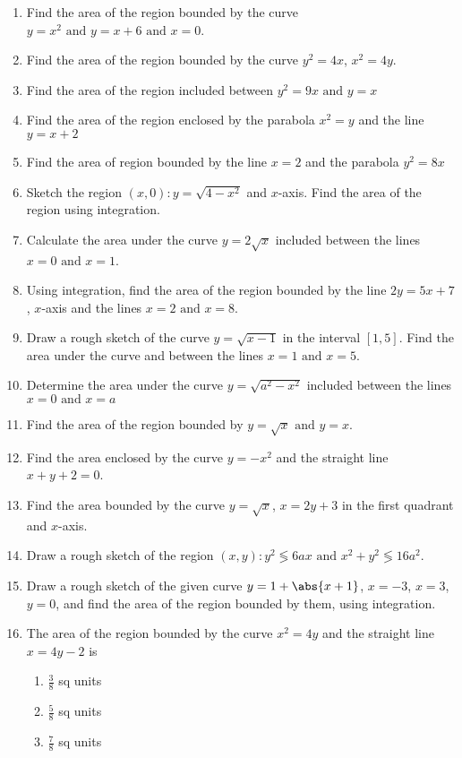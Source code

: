 \begin{enumerate}[label=\thesubsection.\arabic*,ref=\thesubsection.\theenumi]
\item Find the area of the region bounded by the curve $y = x^2\text{ and }y = x + 6\text{ and }x = 0$.
\item Find the area of the region bounded by the curve $y^2 = 4x$, $x^2 = 4y$.
\item Find the area of the region included between $y^2 = 9x\text{ and }y =x$
\item Find the area of the region enclosed by the parabola $x^2 = y$ and the line $y = x + 2$
\item Find the area of region bounded by the line $x = 2$ and the parabola $y^2 = 8x$
\item Sketch the region ${(x,0) : y = \sqrt{4 - x^2}}$ and $x$-axis. Find the area of the region using integration.
\item Calculate the area under the curve $y = 2\sqrt{x}$ included between the lines $x = 0\text{ and }x = 1$.
\item Using integration, find the area of the region bounded by the line $2y = 5x + 7$, $x$-axis and the lines $x = 2\text{ and }x =8$.
\item Draw a rough sketch of the curve $y = \sqrt{x - 1}$ in the interval $[1, 5]$. Find the area under the curve and between the lines $x = 1\text{ and }x = 5$.
\item Determine the area under the curve $y = \sqrt{a^2 - x^2}$ included between the lines $x = 0\text{ and }x = a$
\item Find the area of the region bounded by $y = \sqrt{x}\text{ and }y = x$.
\item Find the area enclosed by the curve $y = - x^2$ and the straight line $x + y + 2 = 0$.
\item Find the area bounded by the curve $y = \sqrt{x}$, $x = 2y + 3$ in the first quadrant and $x$-axis.
\item Draw a rough sketch of the region ${(x, y) : y^2 \lessgtr 6ax\text{ and }x^2 + y^2 \lessgtr 16a^2}$.
\item Draw a  rough sketch of the given curve $y =1 + \abs{x + 1}$, $x = -3$, $x = 3$, $y = 0$, and find the area of the region bounded by them, using integration.
\item The area of the region bounded by the curve $x^2 = 4y$ and the straight line $x = 4y - 2$ is
\begin{enumerate}
\item $\frac{3}{8}$ sq units 
\item $\frac{5}{8}$ sq units
\item $\frac{7}{8}$ sq units 

\end{enumerate}
\end{enumerate}
